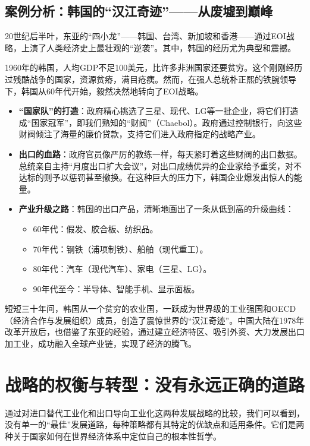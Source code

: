 \subsection{案例分析：韩国的“汉江奇迹”——从废墟到巅峰}

20世纪后半叶，东亚的“四小龙”——韩国、台湾、新加坡和香港——通过EOI战略，上演了人类经济史上最壮观的“逆袭”。其中，韩国的经历尤为典型和震撼。

1960年的韩国，人均GDP不足100美元，比许多非洲国家还要贫穷。这个刚刚经历过残酷战争的国家，资源贫瘠，满目疮痍。然而，在强人总统朴正熙的铁腕领导下，韩国从60年代开始，毅然决然地转向了EOI战略。

\begin{itemize}
    \item \textbf{“国家队”的打造}：政府精心挑选了三星、现代、LG等一批企业，将它们打造成“国家冠军”，即我们熟知的“财阀”（Chaebol）。政府通过控制银行，向这些财阀倾注了海量的廉价贷款，支持它们进入政府指定的战略产业。
    \item \textbf{出口的血路}：政府官员像严厉的教练一样，每天紧盯着这些财阀的出口数据。总统亲自主持“月度出口扩大会议”，对出口成绩优异的企业家给予重奖，对不达标的则予以惩罚甚至撤换。在这种巨大的压力下，韩国企业爆发出惊人的能量。
    \item \textbf{产业升级之路}：韩国的出口产品，清晰地画出了一条从低到高的升级曲线：
    \begin{itemize}
        \item 60年代：假发、胶合板、纺织品。
        \item 70年代：钢铁（浦项制铁）、船舶（现代重工）。
        \item 80年代：汽车（现代汽车）、家电（三星、LG）。
        \item 90年代至今：半导体、智能手机、显示面板。
    \end{itemize}
\end{itemize}

短短三十年间，韩国从一个贫穷的农业国，一跃成为世界级的工业强国和OECD（经济合作与发展组织）成员，创造了震惊世界的“汉江奇迹”。中国大陆在1978年改革开放后，也借鉴了东亚的经验，通过建立经济特区、吸引外资、大力发展出口加工业，成功融入全球产业链，实现了经济的腾飞。

\section{战略的权衡与转型：没有永远正确的道路}

通过对进口替代工业化和出口导向工业化这两种发展战略的比较，我们可以看到，没有单一的“最佳”发展道路，每种策略都有其特定的优缺点和适用条件。它们是两种关于国家如何在世界经济体系中定位自己的根本性哲学。

